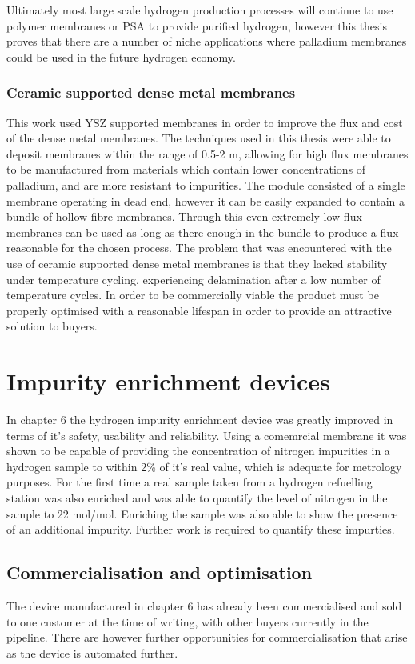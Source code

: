 Ultimately most large scale hydrogen production processes will continue to use polymer membranes or PSA to provide purified hydrogen, however this thesis proves that there are a number of niche applications where palladium membranes could be used in the future hydrogen economy. 

\subsubsection*{Ceramic supported dense metal membranes}
This work used YSZ supported membranes in order to improve the flux and cost of the dense metal membranes. The techniques used in this thesis were able to deposit membranes within the range of 0.5-2 \textmu m, allowing for high flux membranes to be manufactured from materials which contain lower concentrations of palladium, and are more resistant to impurities. The module consisted of a single membrane operating in dead end, however it can be easily expanded to contain a bundle of hollow fibre membranes. Through this even extremely low flux membranes can be used as long as there enough in the bundle to produce a flux reasonable for the chosen process. The problem that was encountered with the use of ceramic supported dense metal membranes is that they lacked stability under temperature cycling, experiencing delamination after a low number of temperature cycles. In order to be commercially viable the product must be properly optimised with a reasonable lifespan in order to provide an attractive solution to buyers. 

\section{Impurity enrichment devices}
In chapter 6 the hydrogen impurity enrichment device was greatly improved in terms of it's safety, usability and reliability. Using a comemrcial membrane it was shown to be capable of providing the concentration of nitrogen impurities in a hydrogen sample to within 2\% of it's real value, which is adequate for metrology purposes. \cite{Murugan2015} For the first time a real sample taken from a hydrogen refuelling station was also enriched and was able to quantify the level of nitrogen in the sample to 22 \textmu mol/mol. Enriching the sample was also able to show the presence of an additional impurity. Further work is required to quantify these impurties. 

\subsection{Commercialisation and optimisation}
The device manufactured in chapter 6 has already been commercialised and sold to one customer at the time of writing, with other buyers currently in the pipeline. There are however further opportunities for commercialisation that arise as the device is automated further. 

